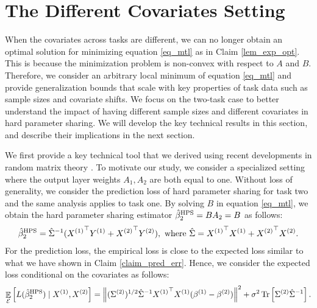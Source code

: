 \section{The Different Covariates Setting}

When the covariates across tasks are different, we can no longer obtain an optimal solution for minimizing equation \eqref{eq_mtl} as in Claim \ref{lem_exp_opt}.
This is because the minimization problem is non-convex with respect to $A$ and $B$.
Therefore, we consider an arbitrary local minimum of equation \eqref{eq_mtl} and provide generalization bounds that scale with key properties of task data such as sample sizes and covariate shifts.
We focus on the two-task case to better understand the impact of having different sample sizes and different covariates in hard parameter sharing. %
We will develop the key technical results in this section, and describe their implications in the next section.

We first provide a key technical tool that we derived using recent developments in random matrix theory \cite{??}.
To motivate our study, we consider a specialized setting where the output layer weights $A_1, A_2$ are both equal to one.
Without loss of generality, we consider the prediction loss of hard parameter sharing for task two and the same analysis applies to task one.
By solving $B$ in equation \eqref{eq_mtl}, we obtain the hard parameter sharing estimator $\hat{\beta}_2^{\textup{HPS}} = B A_2 = B$ as follows:
\begin{align*}
	\hat{\beta}_2^{\textup{HPS}} = {\hat{\Sigma}}^{-1} ({X^{(1)}}^{\top} Y^{(1)} + {X^{(2)}}^{\top} Y^{(2)}), \text{ where } \hat{\Sigma} = {X^{(1)}}^{\top} X^{(1)} + {X^{(2)}}^{\top} X^{(2)}.
\end{align*}
For the prediction loss, the empirical loss is close to the expected loss similar to what we have shown in Claim \ref{claim_pred_err}.
Hence, we consider the expected loss conditional on the covariates as follows:
\begin{align*}
	\mathop{\mathbb{E}}_{\mathcal{E}}\left[ L(\hat{\beta}_2^{\textup{HPS}}) \mid X^{(1)}, X^{(2)} \right] =
	\left\| (\Sigma^{(2)})^{1/2} \hat{\Sigma}^{-1} {X^{(1)}}^{\top} X^{(1)} (\beta^{(1)} - \beta^{(2)}) \right\|^2
	+ \sigma^2 \operatorname{Tr}\left[\Sigma^{(2)}\hat{\Sigma}^{-1}\right].
\end{align*}

